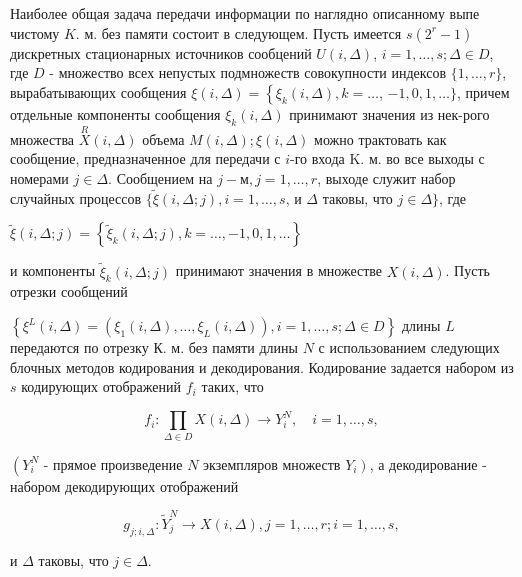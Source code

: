 \documentclass[10pt]{article}
\begin{document}
Наиболее общая задача передачи информации по наглядно описанному выпе чистому $K$. м. без памяти состоит в следующем. Пусть имеется $s\left(2^{r}-1\right)$ дискретных стационарных источников сообцений $U(i, \Delta)$, $i=1, \ldots, s ; \Delta \in D$, где $D$ - множество всех непустых подмножеств совокупности индексов $\{1, \ldots, r\}$, вырабатывающих сообщения $\xi(i, \Delta)=\left\{\xi_{k}(i, \Delta), k=\ldots\right.$, $-1,0,1, \ldots\}$, причем отдельные компоненты сообщения $\xi_{k}(i, \Delta)$ принимают значения из нек-рого множества $\stackrel{R}{X}(i, \Delta)$ объема $M(i, \Delta) ; \xi(i, \Delta)$ можно трактовать как сообщение, предназначенное для передачи с $i$-го входа K. м. во все выходы с номерами $j \in \Delta$. Сообщением на $j-м, j=1, \ldots, r$, выходе служит набор случайных процессов $\{\tilde{\xi}(i, \Delta ; j), i=1, \ldots, s$, и $\Delta$ таковы, что $j \in \Delta\}$, где



$\tilde{\xi}(i, \Delta ; j)=\left\{\tilde{\xi}_{k}(i, \Delta ; j), k=\ldots,-1,0,1, \ldots\right\}$



и компоненты $\tilde{\xi}_{k}(i, \Delta ; j)$ принимают значения в множестве $X(i, \Delta)$. Пусть отрезки сообщений



$\left\{\xi^{L}(i, \Delta)=\left(\xi_{1}(i, \Delta), \ldots, \xi_{L}(i, \Delta)\right), i=1, \ldots, s ; \Delta \in D\right\}$ длины $L$ передаются по отрезку К. м. без памяти длины $N$ с использованием следующих блочных методов кодирования и декодирования. Кодирование задается набором из $s$ кодирующих отображений $f_{i}$ таких, что



\[

f_{i}: \prod_{\Delta \in D} X(i, \Delta) \rightarrow Y_{i}^{N}, \quad i=1, \ldots, s,

\]



$\left(Y_{i}^{N}\right.$ - прямое произведение $N$ экземпляров множеств $\left.Y_{i}\right)$, а декодирование - набором декодирующих отображений



\[

g_{j ; i, \Delta}: \tilde{Y}_{j}^{N} \longrightarrow X(i, \Delta), j=1, \ldots, r ; i=1, \ldots, s,

\]



и $\Delta$ таковы, что $j \in \Delta$.
\end{document}
